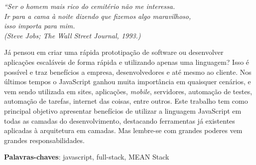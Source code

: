 \documentclass[
	12pt,				%
	openright,			%
	twoside,			%
	a4paper,			%
	english,			%
	brazil				%
	]{abntex2}
\begin{document}

\begin{epigrafe}
    \vspace*{\fill}
	\begin{flushright}
		\textit{``Ser o homem mais rico do cemitério não me interessa.\\
		Ir para a cama à noite dizendo que fizemos algo maravilhoso, \\ isso importa para mim. \\
		(Steve Jobs; The Wall Street Journal, 1993.)}
	\end{flushright}
\end{epigrafe}


\setlength{\absparsep}{18pt} %
\begin{resumo}
Já pensou em criar uma rápida prototipação de software ou desenvolver aplicações escaláveis de forma rápida e utilizando apenas uma linguagem? Isso é possível e traz benefícios a empresa, desenvolvedores e até mesmo ao cliente. Nos últimos tempos o JavaScript ganhou muita importância em quaisquer cenários, e vem sendo utilizada em sites, aplicações, \textit{mobile}, servidores, automação de testes, automação de tarefas, internet das coisas, entre outros. Este trabalho tem como principal objetivo apresentar benefícios de utilizar a linguagem JavaScript em todas as camadas do desenvolvimento, destacando ferramentas já existentes aplicadas à arquitetura em camadas. Mas lembre-se com grandes poderes vem grandes responsabilidades.

 \vspace{\onelineskip}

 \textbf{Palavras-chaves}: javascript, full-stack, MEAN Stack
\end{resumo}
\end{document}
